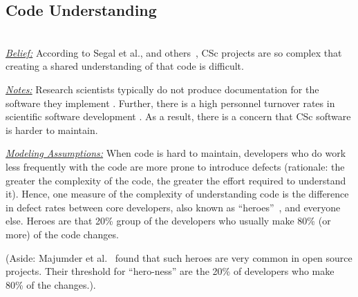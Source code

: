 \documentclass[conference,10pt]{IEEEtran}
\begin{document}





  
 
\subsection{Code Understanding} ~\\
\noindent \textit{\underline{Belief:}} According to
Segal et al., and others~\cite{segal07_problem, carver06_hpc, Shull05_parallel, sanders08_risk},
CSc projects are so complex that creating
a shared understanding of that code is difficult. 


\noindent \textit{\underline{Notes:}} Research scientists typically do not produce documentation for the software they implement \cite{segal07_enduser, sanders08_risk}.
Further, there is a high personnel turnover rates in scientific software development \cite{carver06_hpc, segal07_problem}. As a result, there is a concern that CSc software is harder to maintain. 

\noindent \textit{\underline{Modeling Assumptions:}} 
When code is hard to maintain,
developers who do work less frequently with the code are more prone to introduce defects
(rationale: the greater the complexity of the code, the greater the effort required to understand it).
Hence, one measure of the complexity of understanding code
is the difference in defect rates between core developers, also known as ``heroes''~\cite{agrawal2018we, goeminne2011evidence, torres2011analysis, robles2009evolution}, and everyone else.
Heroes are that  20\% group of the developers who usually make 80\% (or more) of the code changes.

(Aside:   Majumder et al.~\cite{majumder19_heroes} found that such heroes are very common in open source projects. Their threshold for ``hero-ness'' are the 20\% of developers
who make 80\% of the changes.).
\end{document}

